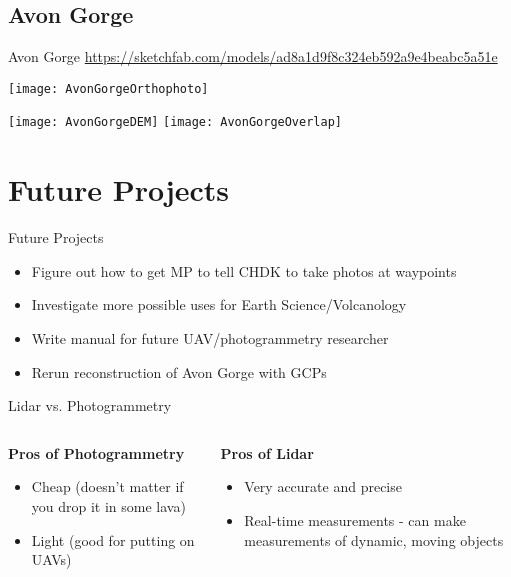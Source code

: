 \documentclass[table]{beamer}
\begin{document}
\subsection{Avon Gorge}

\begin{frame}{Avon Gorge}
    \url{https://sketchfab.com/models/ad8a1d9f8c324eb592a9e4beabc5a51e}
    \begin{center}
        \texttt{[image: AvonGorgeOrthophoto]}
    \end{center}
    \begin{center}
        \texttt{[image: AvonGorgeDEM]}
        \texttt{[image: AvonGorgeOverlap]}
    \end{center}
\end{frame}

\section{Future Projects}

\begin{frame}{Future Projects}
    \begin{itemize}
        \item Figure out how to get MP to tell CHDK to take photos at waypoints
        \item Investigate more possible uses for Earth Science/Volcanology
        \item Write manual for future UAV/photogrammetry researcher
        \item Rerun reconstruction of Avon Gorge with GCPs
    \end{itemize}
\end{frame}

\begin{frame}{Lidar vs. Photogrammetry}
    \begin{columns}[c]
        \begin{column}[c]{5cm}
            \textbf{Pros of Photogrammetry}
            \begin{itemize}
                \item Cheap (doesn't matter if you drop it in some lava)
                \item Light (good for putting on UAVs)
            \end{itemize}
        \end{column}
        \begin{column}[c]{5cm}
            \textbf{Pros of Lidar}
            \begin{itemize}
                \item Very accurate and precise
                \item Real-time measurements - can make measurements of
                    dynamic, moving objects
            \end{itemize}
        \end{column}
    \end{columns}
\end{frame}
\end{document}

